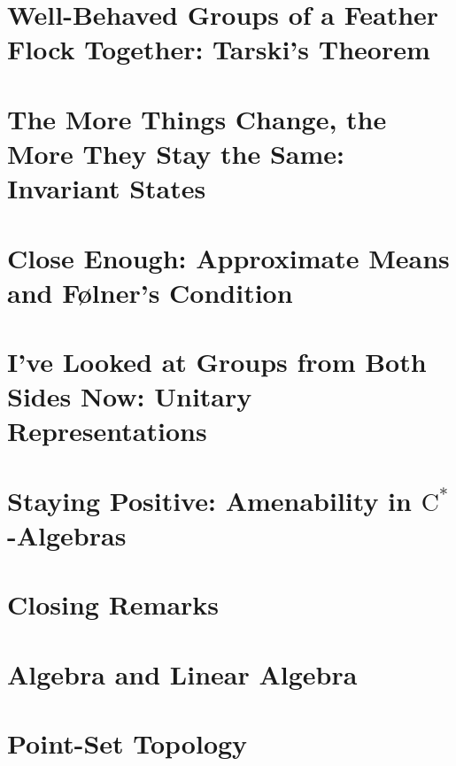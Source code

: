 \documentclass[11pt]{package2}
\begin{document}
\chapter{Well-Behaved Groups of a Feather Flock Together: Tarski's Theorem}\label{ch:tarskis_theorem}

\chapter{The More Things Change, the More They Stay the Same: Invariant States}\label{ch:invariant_states}

\chapter{Close Enough: Approximate Means and Følner's Condition}\label{ch:folner_condition}

\chapter{I've Looked at Groups from Both Sides Now: Unitary Representations}\label{ch:left_regular_representation}

\chapter{Staying Positive: Amenability in \texorpdfstring{$\mathrm{C}^{\ast}$-Algebras}{C*-Algebras}}\label{ch:nuclearity}

\chapter{Closing Remarks}

\appendix
\chapter{Algebra and Linear Algebra}\label{ch:algebra_and_linear_algebra}

\chapter{Point-Set Topology}\label{ch:point_set_topology}

\end{document}
